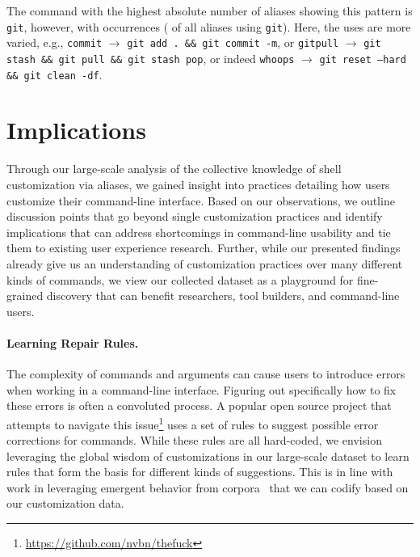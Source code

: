 \documentclass[smallextended,natbib]{svjour3}
\newcommand{\num}[1]{\numprint{#1}}
\newcommand{\per}[1]{\numprint[\%]{#1}}
\newcommand{\alias}[2]{{\texttt{#1} $\rightarrow$ \texttt{#2}}}
\newcommand{\cmd}[1]{{\texttt{#1}}}
\begin{document}
The command with the highest absolute number of aliases showing this pattern is \cmd{git}, however, with \num{12063} occurrences (\per{3.89} of all aliases using \cmd{git}).
Here, the uses are more varied, 
e.g., \alias{commit}{git add . \&\& git commit -m}, 
or \alias{gitpull}{git stash \&\& git pull \&\& git stash pop},
or indeed \alias{whoops}{git reset --hard \&\& git clean -df}.

\section{Implications}

Through our large-scale analysis of the collective knowledge of shell customization via aliases,
we gained insight into practices detailing how users customize their command-line interface.
Based on our observations, we outline discussion points that go beyond single customization practices and identify implications that can address shortcomings in command-line usability and tie them to existing user experience research.
Further, while our presented findings already give us an understanding of customization practices over many different kinds of commands, we view our collected dataset as a playground for fine-grained discovery that can benefit researchers, tool builders, and command-line users.

\paragraph{Learning Repair Rules.}

The complexity of commands and arguments can cause users to introduce errors when working in a command-line interface.
Figuring out specifically how to fix these errors is often a convoluted process.
A popular open source project that attempts to navigate this issue\footnote{\url{https://github.com/nvbn/thefuck}} uses a set of rules to suggest possible error corrections for commands.
While these rules are all hard-coded, we envision leveraging the global wisdom of customizations in our large-scale dataset to learn rules that form the basis for different kinds of suggestions.
This is in line with work in leveraging emergent behavior from corpora~\citep{fast:14} that we can codify based on our customization data.
\end{document}
